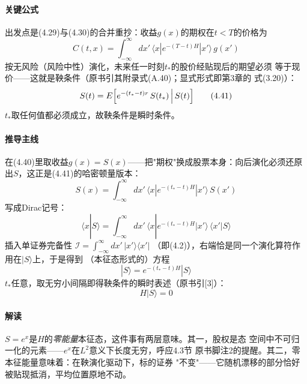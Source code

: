 \paragraph{关键公式}
出发点是(4.29)与(4.30)的合并重抄：收益$g(x)$的期权在$t<T$的价格为
\begin{equation*}
C(t,x)=\int_{-\infty}^{\infty}dx'\,
\langle x|e^{-(T-t)H}|x'\rangle\,g(x')
\tag{4.40}
\end{equation*}
按无风险（风险中性）演化，未来任一时刻$t_{*}$的股价经贴现后的期望必须
等于现价——这就是鞅条件（原书引其附录式(A.40)；显式形式即第3章的
式(3.20)）：
\begin{equation*}
S(t)=E\Bigl[e^{-(t_{*}-t)r}\,S(t_{*})\,\Big|\,S(t)\Bigr]
\tag{4.41}
\end{equation*}
$t_{*}$取任何值都必须成立，故鞅条件是瞬时条件。

\paragraph{推导主线}
在(4.40)里取收益$g(x)=S(x)$——把"期权"换成股票本身：向后演化必须还原
出$S$，这正是(4.41)的哈密顿量版本：
\begin{equation*}
S(x)=\int_{-\infty}^{\infty}dx'\,
\langle x|e^{-(t_{*}-t)H}|x'\rangle\,S(x')
\end{equation*}
写成Dirac记号：
\begin{equation*}
\langle x|S\rangle=\int_{-\infty}^{\infty}dx'\,
\langle x|e^{-(t_{*}-t)H}|x'\rangle\,\langle x'|S\rangle
\tag{4.42}
\end{equation*}
插入单证券完备性
$\mathcal{I}=\int_{-\infty}^{\infty}dx'\,|x'\rangle\langle x'|$
（即(4.2)），右端恰是同一个演化算符作用在$|S\rangle$上，于是得到
（本征态形式的）方程
\begin{equation*}
|S\rangle=e^{-(t_{*}-t)H}|S\rangle
\end{equation*}
$t_{*}$任意，取无穷小间隔即得鞅条件的瞬时表述（原书引[3]）：
\begin{equation*}
H|S\rangle=0
\tag{4.43}
\end{equation*}

\paragraph{解读}
$S=e^{x}$是$H$的\emph{零能量}本征态，这件事有两层意味。其一，股权是态
空间中不可归一化的元素——$e^{x}$在$L^{2}$意义下长度无穷，呼应4.3节
原书脚注2的提醒。其二，零本征能量意味着：在鞅演化驱动下，标的证券
"不变"——它随机漂移的部分恰好被贴现抵消，平均位置原地不动。

